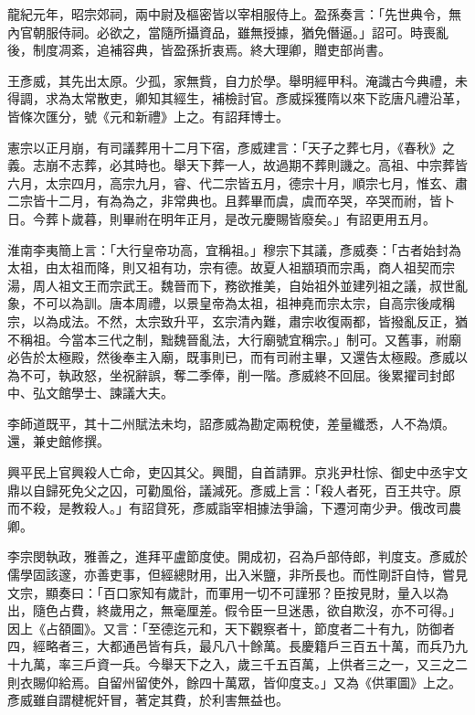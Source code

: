 \begin{pinyinscope}
 龍紀元年，昭宗郊祠，兩中尉及樞密皆以宰相服侍上。盈孫奏言：「先世典令，無內官朝服侍祠。必欲之，當隨所攝資品，雖無授據，猶免僭逼。」詔可。時喪亂後，制度凋紊，追補容典，皆盈孫折衷焉。終大理卿，贈吏部尚書。



 王彥威，其先出太原。少孤，家無貲，自力於學。舉明經甲科。淹識古今典禮，未得調，求為太常散吏，卿知其經生，補檢討官。彥威採獲隋以來下訖唐凡禮沿革，皆條次匯分，號《元和新禮》上之。有詔拜博士。



 憲宗以正月崩，有司議葬用十二月下宿，彥威建言：「天子之葬七月，《春秋》之義。志崩不志葬，必其時也。舉天下葬一人，故過期不葬則譏之。高祖、中宗葬皆六月，太宗四月，高宗九月，睿、代二宗皆五月，德宗十月，順宗七月，惟玄、肅二宗皆十二月，有為為之，非常典也。且葬畢而虞，虞而卒哭，卒哭而祔，皆卜日。今葬卜歲暮，則畢祔在明年正月，是改元慶賜皆廢矣。」有詔更用五月。



 淮南李夷簡上言：「大行皇帝功高，宜稱祖。」穆宗下其議，彥威奏：「古者始封為太祖，由太祖而降，則又祖有功，宗有德。故夏人祖顓頊而宗禹，商人祖契而宗湯，周人祖文王而宗武王。魏晉而下，務欲推美，自始祖外並建列祖之議，叔世亂象，不可以為訓。唐本周禮，以景皇帝為太祖，祖神堯而宗太宗，自高宗後咸稱宗，以為成法。不然，太宗致升平，玄宗清內難，肅宗收復兩都，皆撥亂反正，猶不稱祖。今當本三代之制，黜魏晉亂法，大行廟號宜稱宗。」制可。又舊事，祔廟必告於太極殿，然後奉主入廟，既事則已，而有司祔主畢，又還告太極殿。彥威以為不可，執政怒，坐祝辭誤，奪二季俸，削一階。彥威終不回屈。後累擢司封郎中、弘文館學士、諫議大夫。



 李師道既平，其十二州賦法未均，詔彥威為勘定兩稅使，差量纖悉，人不為煩。還，兼史館修撰。



 興平民上官興殺人亡命，吏囚其父。興聞，自首請罪。京兆尹杜悰、御史中丞宇文鼎以自歸死免父之囚，可勸風俗，議減死。彥威上言：「殺人者死，百王共守。原而不殺，是教殺人。」有詔貸死，彥威詣宰相據法爭論，下遷河南少尹。俄改司農卿。



 李宗閔執政，雅善之，進拜平盧節度使。開成初，召為戶部侍郎，判度支。彥威於儒學固該邃，亦善吏事，但經總財用，出入米鹽，非所長也。而性剛訐自恃，嘗見文宗，顯奏曰：「百口家知有歲計，而軍用一切不可謹邪？臣按見財，量入以為出，隨色占費，終歲用之，無毫厘差。假令臣一旦迷愚，欲自欺沒，亦不可得。」因上《占頟圖》。又言：「至德迄元和，天下觀察者十，節度者二十有九，防御者四，經略者三，大都通邑皆有兵，最凡八十餘萬。長慶籍戶三百五十萬，而兵乃九十九萬，率三戶資一兵。今舉天下之入，歲三千五百萬，上供者三之一，又三之二則衣賜仰給焉。自留州留使外，餘四十萬眾，皆仰度支。」又為《供軍圖》上之。彥威雖自謂楗柅奸冒，著定其費，於利害無益也。




\end{pinyinscope}
